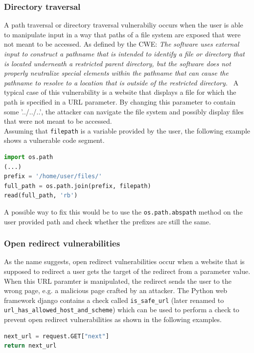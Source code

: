 \documentclass[
	a4paper,
	pagesize,
	pdftex,
	12pt,
	twoside, %
	BCOR=5mm, %
	ngerman,
	fleqn,
	final,
	]{scrartcl}
\begin{document}
\subsubsection{Directory traversal}
A path traversal or directory traversal vulnerabiliy occurs when the user is able to manipulate input in a way that paths of a file system are exposed that were not meant to be accessed. 
As defined by the CWE: \textit{The software uses external input to construct a pathname that is intended to identify a file or directory that is located underneath a restricted parent directory, but the software does not properly neutralize special elements within the pathname that can cause the pathname to resolve to a location that is outside of the restricted directory.}~\cite{CommonWeaknessEnumeration.19.9.2019c}  A typical case of this vulnerability is a website that displays a file for which the path is specified in a URL parameter. By changing this parameter to contain some '../../..', the attacker can navigate the file system and possibly display files that were not meant to be accessed.\\
Assuming that \texttt{filepath} is a variable provided by the user, the following example shows a vulnerable code segment.
\begin{lstlisting}[language=Python, showstringspaces=False]
import os.path
(...)
prefix = '/home/user/files/'
full_path = os.path.join(prefix, filepath)
read(full_path, 'rb')
\end{lstlisting}
A possible way to fix this would be to use the \texttt{os.path.abspath} method on the user provided path and check whether the prefixes are still the same. 



\subsubsection{Open redirect vulnerabilities}
As the name suggests, open redirect vulnerabilities occur when a website that is supposed to redirect a user gets the target of the redirect from a parameter value. When this URL paramter is manipulated, the redirect sends the user to the wrong page, e.g. a malicious page crafted by an attacker. The Python web framework django contains a check called \texttt{is\_safe\_url} (later renamed to \texttt{url\_has\_allowed\_host\_and\_scheme}) which can be used to perform a check to prevent open redirect vulnerabilities as shown in the following examples.

\begin{lstlisting}[language=Python, showstringspaces=False]
next_url = request.GET["next"]
return next_url
\end{lstlisting}
\end{document}
